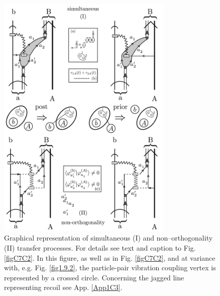  \begin{figure}[h!]
 	\begin{center}
\includegraphics*[width=0.75\textwidth]{C7/figs_C7/Reaction1}
\end{center}
\caption{Graphical representation of simultaneous (I) and non--orthogonality (II) transfer processes. For details see text and  caption to Fig. \ref{figC7C2}. In this figure, as well as in Fig. \ref{figC7C2}, and at variance with, e.g. Fig. \ref{fig1.9.2}, the particle-pair vibration coupling vertex is represented by a crossed circle. Concerning the jagged line representing recoil see App. \ref{App1C3}.}\label{figC7C1}
\end{figure}
